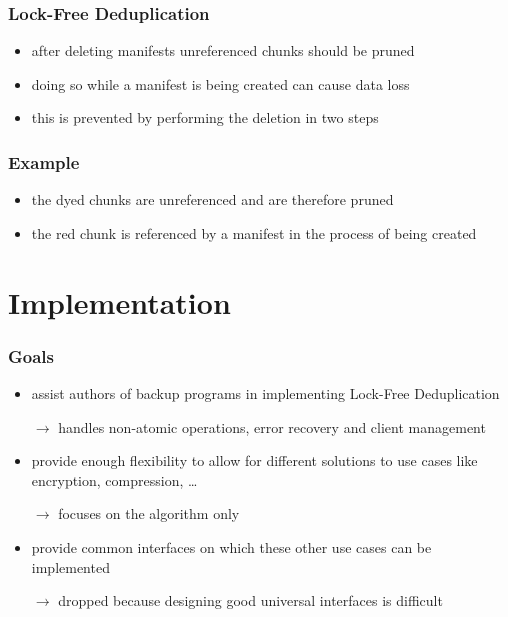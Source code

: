 \documentclass[english,utf8,aspectratio=169]{beamer}
\begin{document}
    \begin{frame}
        \frametitle{Lock-Free Deduplication}
        \begin{itemize}
            \item after deleting manifests unreferenced chunks should be pruned
            \item doing so while a manifest is being created can cause data loss
            \item this is prevented by performing the deletion in two steps
        \end{itemize}

        \begin{center}
            
        \end{center}
    \end{frame}

    \begin{frame}
        \frametitle{Example}
        \begin{itemize}
            \item the dyed chunks are unreferenced and are therefore pruned
            \item the red chunk is referenced by a manifest in the process of being created
        \end{itemize}
        \begin{center}
            
        \end{center}
    \end{frame}

    \section{Implementation}
    \begin{frame}
        \frametitle{Goals}
        \begin{itemize}
            \item assist authors of backup programs in implementing Lock-Free Deduplication

                $\rightarrow$ handles non-atomic operations, error recovery and client management

            \item provide enough flexibility to allow for different solutions to use cases
                like encryption, compression, \ldots

                $\rightarrow$ focuses on the algorithm only
            
            \item provide common interfaces on which these other use cases can be implemented

                $\rightarrow$ dropped because designing good universal interfaces is difficult
        \end{itemize}
    \end{frame}
\end{document}
